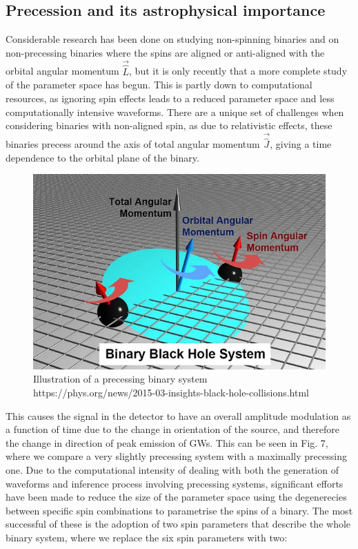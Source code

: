 \documentclass[]{article}
\begin{document}
\subsection{Precession and its astrophysical importance}
Considerable research has been done on studying non-spinning binaries and on non-precessing binaries where the spins are aligned or anti-aligned with the orbital angular momentum $\vec{\hat{L}}$\cite{pe3}, but it is only recently that a more complete study of the parameter space has begun\cite{sloos}\cite{pe_latest}. This is partly down to computational resources, as ignoring spin effects leads to a reduced parameter space and less computationally intensive waveforms. There are a unique set of challenges when considering binaries with non-aligned spin, as due to relativistic effects, these binaries precess around the axis of total angular momentum $\vec{\hat{J}}$, giving a time dependence to the orbital plane of the binary\cite{precess1}\cite{precess2}.
\begin{figure}[h]
	\includegraphics[scale=0.75]{fig6.jpg}
	\centering
	\caption{Illustration of a precessing binary system https://phys.org/news/2015-03-insights-black-hole-collisions.html}
	\centering
\end{figure}
This causes the signal in the detector to have an overall amplitude modulation as a function of time due to the change in orientation of the source, and therefore the change in direction of peak emission of GWs. This can be seen in Fig. 7, where we compare a very slightly precessing system with a maximally precessing one. Due to the computational intensity of dealing with both the generation of waveforms and inference process involving precessing systems, significant efforts have been made to reduce the size of the parameter space using the degenerecies between specific spin combinations to parametrise the spins of a binary. The most successful of these is the adoption of two spin parameters\cite{imr}\cite{chip} that describe the whole binary system, where we replace the six spin parameters with two:
\end{document}
